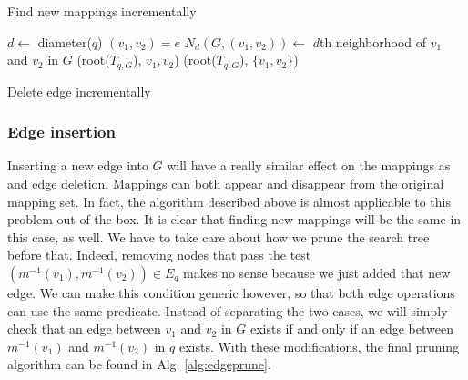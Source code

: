 \begin{algorithm}[ht]
    \SetAlgoLined\DontPrintSemicolon    
    
    \caption{Find new mappings incrementally}
    \label{alg:deledgefind}
\end{algorithm}

\begin{algorithm}[ht]
    \SetAlgoLined\DontPrintSemicolon    
    
    \nl $d \gets $ diameter($q$)\;
    \nl $(v_1, v_2) = e$\;
    \nl $N_d(G, (v_1, v_2)) \gets$ $d$th neighborhood of $v_1$ and $v_2$ in $G$\;
    \nl \prune(root($T_{q, G}$), $v_1, v_2$)\;
    \nl \find(root($T_{q, G}$), $\{v_1, v_2\}$)\;    
    
    \caption{Delete edge incrementally}
    \label{alg:deledge}
\end{algorithm}


\subsubsection{Edge insertion}

Inserting a new edge into $G$ will have a really similar effect on the mappings as and edge
deletion. Mappings can both appear and disappear from the original mapping set. In fact, the
algorithm described above is almost applicable to this problem out of the box. It is clear 
that finding new mappings will be the same in this case, as well. We have to take care about
how we prune the search tree before that. Indeed, removing nodes that pass the test 
$(m^{-1}(v_1), m^{-1}(v_2)) \in E_q$ makes no sense because we just added that new edge. We
can make this condition generic however, so that both edge operations can use the same predicate.
Instead of separating the two cases, we will simply check that an edge between $v_1$ and $v_2$
in $G$ exists if and only if an edge between $m^{-1}(v_1)$ and $m^{-1}(v_2)$ in $q$ exists.
With these modifications, the final pruning algorithm can be found in Alg. \ref{alg:edgeprune}.

